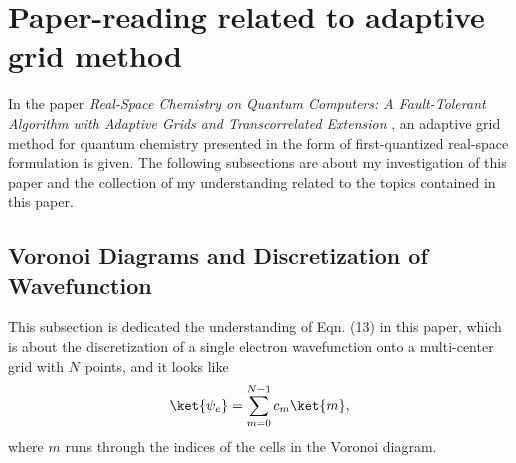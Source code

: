 \section{Paper-reading related to adaptive grid method}
\label{section:AdaptiveGridMethod}
In the paper \textit{Real-Space Chemistry on Quantum Computers: A Fault-Tolerant Algorithm with Adaptive Grids and Transcorrelated Extension} \cite{feniou2025realspacechemistryquantumcomputers}, an adaptive grid method for quantum chemistry presented in the form of first-quantized real-space formulation is given. The following subsections are about my investigation of this paper and the collection of my understanding related to the topics contained in this paper.
\subsection{Voronoi Diagrams and Discretization of Wavefunction}
This subsection is dedicated the understanding of Eqn. (13) in this paper, which is about the discretization of a single electron wavefunction onto a multi-center grid with $N$ points, and it looks like
\begin{equation}
    \ket{\psi_e}=\sum_{m=0}^{N-1}c_m\ket{m},
    \label{eqn:discretizedBase}
\end{equation}
where $m$ runs through the indices of the cells in the Voronoi diagram.

